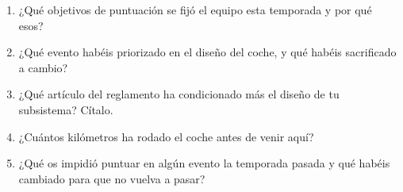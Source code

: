 \begin{juez}
\begin{enumerate}
  \item ¿Qué objetivos de puntuación se fijó el equipo esta temporada y por qué esos?
  \item ¿Qué evento habéis priorizado en el diseño del coche, y qué habéis
        sacrificado a cambio?
  \item ¿Qué artículo del reglamento ha condicionado más el diseño de tu
        subsistema? Cítalo.
  \item ¿Cuántos kilómetros ha rodado el coche antes de venir aquí?
  \item ¿Qué os impidió puntuar en algún evento la temporada pasada y qué habéis
        cambiado para que no vuelva a pasar?
\end{enumerate}
\end{juez}
